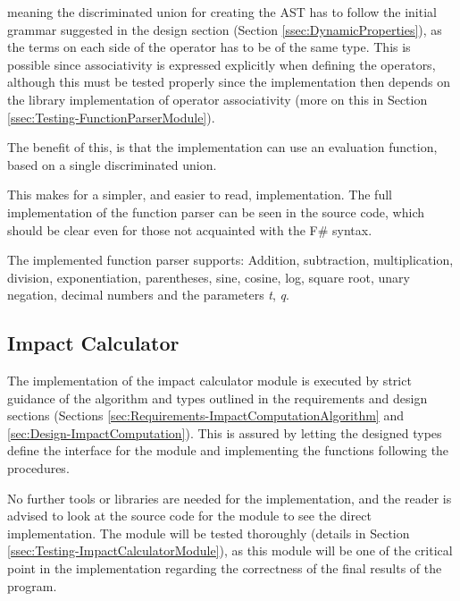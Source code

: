 meaning the discriminated union for creating the AST has to follow the initial grammar suggested in the design section (Section \ref{ssec:DynamicProperties}), as the terms on each side of the operator has to be of the same type. This is possible since associativity is expressed explicitly when defining the operators, although this must be tested properly since the implementation then depends on the library implementation of operator associativity (more on this in Section \ref{ssec:Testing-FunctionParserModule}).

The benefit of this, is that the implementation can use an evaluation function, based on a single discriminated union.

This makes for a simpler, and easier to read, implementation. The full implementation of the function parser can be seen in the source code, which should be clear even for those not acquainted with the F\# syntax.

The implemented function parser supports: Addition, subtraction, multiplication, division, exponentiation, parentheses, sine, cosine, log, square root, unary negation, decimal numbers and the parameters \textit{t}, \textit{q}. 

\subsection{Impact Calculator} \label{ssec:Implementation-ImpactCalculator}

The implementation of the impact calculator module is executed by strict guidance of the algorithm and types outlined in the requirements and design sections (Sections \ref{sec:Requirements-ImpactComputationAlgorithm} and \ref{sec:Design-ImpactComputation}). This is assured by letting the designed types define the interface for the module and implementing the functions following the procedures.

No further tools or libraries are needed for the implementation, and the reader is advised to look at the source code for the module to see the direct implementation. The module will be tested thoroughly (details in Section \ref{ssec:Testing-ImpactCalculatorModule}), as this module will be one of the critical point in the implementation regarding the correctness of the final results of the program.